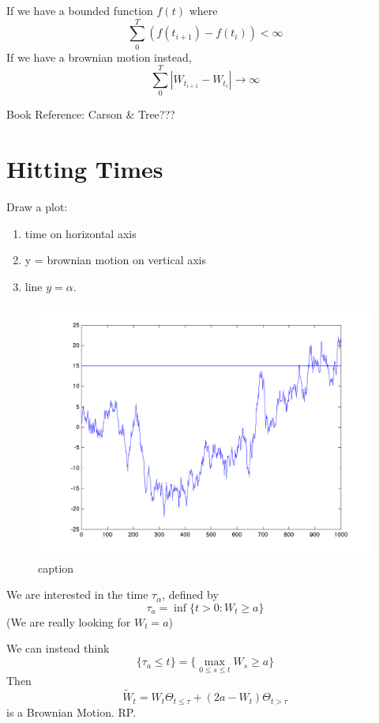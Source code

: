 \documentclass[twocolumn,openany]{book}
\begin{document}
If we have a bounded function $f(t)$ where
\begin{equation}
	\sum_{0}^T \left( f(t_{i+1}) - f(t_i) \right) < \infty
\end{equation}
If we have a brownian motion instead,
\begin{equation}
	\sum_0^T \left| W_{t_{i+1}} - W_{t_i} \right| \to \infty
\end{equation}

Book Reference: Carson \& Tree???

\section{Hitting Times}
Draw a plot:
\begin{enumerate}
	\item time on horizontal axis
	\item y = brownian motion on vertical axis
	\item line $y=\alpha$.
\end{enumerate}

\begin{figure}[htbp]
	\centering
		\includegraphics[width=.9\linewidth]{brownian_motion.png}
	\caption{caption}
	\label{fig:label}
\end{figure}

We are interested in the time $\tau_{\alpha}$, defined by
\begin{equation}
	\tau_a = \inf \{ t>0 : W_t \geq a \}
\end{equation}
(We are really looking for $W_t=a$)

We can instead think
\begin{equation}
	\{ \tau_a\leq t \} = \{ \max_{0\leq s \leq t} W_s \geq a \}
\end{equation}
Then
\begin{equation}
	\tilde{W}_t = W_t \Theta_{t \leq \tau} + (2a - W_t) \Theta_{t > \tau}
\end{equation}
is a Brownian Motion. RP.
\end{document}
